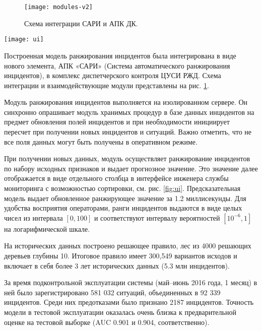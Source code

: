 \begin{figure}[thb]
\centering
\texttt{[image: modules-v2]}
\centering
\caption{Схема интеграции САРИ и АПК ДК.}
\centering
\label{fig:modules}
\end{figure}

\begin{figure*}[thb]
\centering
\texttt{[image: ui]}
\caption{Отображение результатов ранжирования в пользовательском интерфейсе инженера службы мониторинга.}
\centering
\label{fig:ui}
\end{figure*}

Построенная модель ранжирования инцидентов была интегрирована в виде нового элемента, АПК «САРИ» (Система автоматического ранжирования инцидентов), в комплекс диспетчерского контроля ЦУСИ РЖД. Схема интеграции и взаимодействующие модули представлены на рис. \ref{fig:modules}.

Модуль ранжирования инцидентов выполняется на изолированном сервере. Он синхронно опрашивает модуль хранимых процедур в базе данных инцидентов на предмет обновления полей инцидентов и при необходимости инициирует пересчет при получении новых инцидентов и ситуаций. Важно отметить, что не все поля данных могут быть получены в оперативном режиме.

При получении новых данных, модуль осуществляет ранжирование инцидентов по набору исходных признаков и выдает прогнозное значение. Это значение далее отображается в виде отдельного столбца в интерфейсе инженера службы мониторинга с возможностью сортировки, см. рис. \ref{fig:ui}. Предсказательная модель выдает обновленное ранжирующее значение за 1.2 миллисекунды. Для удобства восприятия операторами, ранги инцидентов выдаются в виде целых чисел из интервала $[0,100]$ и соответствуют интервалу вероятностей $[10^{-6},1]$ на логарифмической шкале.


На исторических данных построено решающее правило, лес из 4000 решающих деревьев глубины 10.  Итоговое правило имеет 300,549 вариантов исходов и включает в себя более 3 лет исторических данных (5.3 млн инцидентов).

За время подконтрольной эксплуатации системы (май--июнь 2016 года, 1 месяц) в ней было зарегистрировано 581 032 ситуаций, объединенных в 92 339 инцидентов. Среди них предотказами было признано 2187 инцидентов. %
Точность модели в тестовой эксплуатации оказалась очень близка к предварительной оценке на тестовой выборке (AUC 0.901 и 0.904, соответственно).

